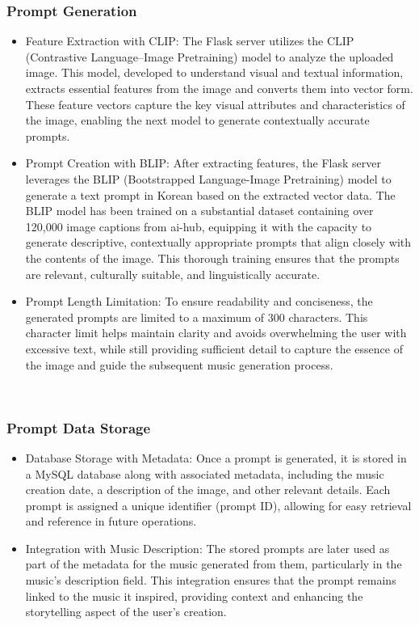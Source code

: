 \documentclass[conference]{IEEEtran}
\begin{document}
\subsubsection{Prompt Generation}
\begin{itemize}
    \item Feature Extraction with CLIP: The Flask server utilizes the CLIP (Contrastive Language–Image Pretraining) model to analyze the uploaded image. This model, developed to understand visual and textual information, extracts essential features from the image and converts them into vector form. These feature vectors capture the key visual attributes and characteristics of the image, enabling the next model to generate contextually accurate prompts.\\
    \item Prompt Creation with BLIP: After extracting features, the Flask server leverages the BLIP (Bootstrapped Language-Image Pretraining) model to generate a text prompt in Korean based on the extracted vector data. The BLIP model has been trained on a substantial dataset containing over 120,000 image captions from ai-hub, equipping it with the capacity to generate descriptive, contextually appropriate prompts that align closely with the contents of the image. This thorough training ensures that the prompts are relevant, culturally suitable, and linguistically accurate.\\
    \item Prompt Length Limitation: To ensure readability and conciseness, the generated prompts are limited to a maximum of 300 characters. This character limit helps maintain clarity and avoids overwhelming the user with excessive text, while still providing sufficient detail to capture the essence of the image and guide the subsequent music generation process.\\
\end{itemize}
\

\subsubsection{Prompt Data Storage}
\begin{itemize}
    \item Database Storage with Metadata: Once a prompt is generated, it is stored in a MySQL database along with associated metadata, including the music creation date, a description of the image, and other relevant details. Each prompt is assigned a unique identifier (prompt ID), allowing for easy retrieval and reference in future operations.\\
    \item Integration with Music Description: The stored prompts are later used as part of the metadata for the music generated from them, particularly in the music’s description field. This integration ensures that the prompt remains linked to the music it inspired, providing context and enhancing the storytelling aspect of the user’s creation.\\
\end{itemize}
\end{document}
